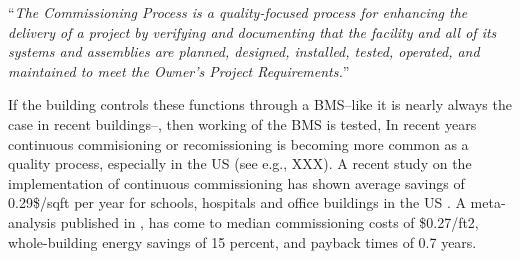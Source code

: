 ``\emph{The Commissioning Process is a quality-focused process for enhancing the delivery of a project by verifying and documenting that the facility and all of its systems and assemblies are planned, designed, installed, tested, operated, and maintained to meet the Owner's Project Requirements.}''

If the building controls these functions through a BMS--like it is nearly always the case in recent buildings--, then working of the BMS is tested, 
In recent years continuous commisioning or recomissioning is becoming more common as a quality process, especially in the US (see e.g., XXX).
A recent study on the implementation of continuous commissioning has shown average savings of 0.29\$/sqft per year for schools, hospitals and office buildings in the US \cite{oh2014implemented}.
A meta-analysis published in \cite{mills2004cost}, has come to median commissioning costs of \$0.27/ft2, whole-building energy savings of 15 percent, and payback times of 0.7 years.